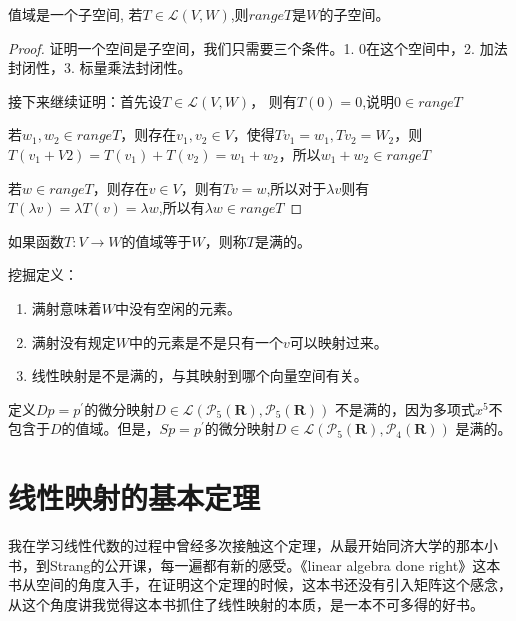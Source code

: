 \documentclass[10pt,a4paper,UTF8]{article}
\begin{document}
\begin{theorem}
值域是一个子空间, 若\(T\in \mathcal{L}(V,W)\),则\(rangeT\)是\(W\)的子空间。
\end{theorem}
\begin{proof}
证明一个空间是子空间，我们只需要三个条件。1. \(0\)在这个空间中，2. 加法封闭性，3. 标量乘法封闭性。 

接下来继续证明：首先设\(T\in \mathcal{L}(V,W)\)， 则有\(T(0) = 0\),说明\(0 \in rangeT\)

若\(w_{1},w_{2}\in rangeT\)，则存在\(v_{1},v_{2}\in V\)，使得\(Tv_{1} = w_{1},Tv_{2} = W_{2}\)，则\(T(v_{1} + V2) = T(v_{1}) + T(v_{2}) = w_{1} + w_{2}\)，所以\(w_{1} + w_{2}\in rangeT\)

若\(w\in rangeT\)，则存在\(v\in V\)，则有\(Tv=w\),所以对于\(\lambda v\)则有\(T(\lambda v) = \lambda T(v) = \lambda w\),所以有\(\lambda w\in rangeT\)
\end{proof}

\begin{definition}
如果函数\(T:V\rightarrow W\)的值域等于\(W\)，则称\(T\)是满的。
\end{definition}

挖掘定义：
\begin{enumerate}
\item 满射意味着\(W\)中没有空闲的元素。
\item 满射没有规定\(W\)中的元素是不是只有一个\(v\)可以映射过来。
\item 线性映射是不是满的，与其映射到哪个向量空间有关。
\end{enumerate}

定义\(Dp=p^{'}\)的微分映射\(D\in \mathcal{L}( \mathcal{P}_{5}( \mathbf{R}), \mathcal{P}_{5}( \mathbf{R}))\) 不是满的，因为多项式\(x^{5}\)不包含于\(D\)的值域。但是，\(Sp=p^{'}\)的微分映射\(D\in \mathcal{L}( \mathcal{P}_{5}( \mathbf{R}), \mathcal{P}_{4}( \mathbf{R}))\) 是满的。
\section{线性映射的基本定理}
\label{sec:org8dd92eb}


我在学习线性代数的过程中曾经多次接触这个定理，从最开始同济大学的那本小书，到Strang的公开课，每一遍都有新的感受。《linear algebra done right》这本书从空间的角度入手，在证明这个定理的时候，这本书还没有引入矩阵这个感念，从这个角度讲我觉得这本书抓住了线性映射的本质，是一本不可多得的好书。
\end{document}
